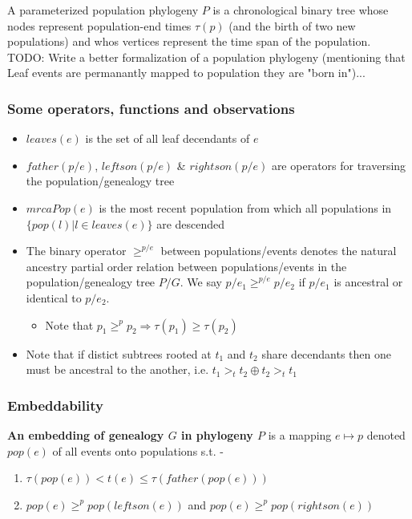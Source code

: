 \documentclass[11pt]{article}
\newcommand{\1}{\mathbbm{1}}
\begin{document}
A parameterized population phylogeny $P$ is a chronological binary tree whose nodes represent population-end times $\tau(p)$ (and the birth of two new populations) and whos vertices represent the time span of the population. TODO: Write a better formalization of a population phylogeny (mentioning that Leaf events are permanantly mapped to population they are "born in")...

\subsubsection{Some operators, functions and observations}

\begin{itemize}


\item $leaves(e)$ is the set of all leaf decendants of $e$

\item $father(p/e)$, $leftson(p/e)$ \& $rightson(p/e)$ are operators for traversing the population/genealogy tree

\item $mrcaPop(e)$ is the most recent population from which all populations in $\{pop(l) | l \in leaves(e)\}$ are descended


\item The binary operator $\geq^{p/e}$ between populations/events denotes the natural ancestry partial order relation between populations/events in the population/genealogy tree $P/G$. We say $p/e_1 \geq^{p/e} p/e_2$ if $p/e_1$ is ancestral or identical to $p/e_2$.
\begin{itemize}
\item Note that $p_1 \geq^p p_2 \Rightarrow \tau(p_1) \geq \tau(p_2)$
\end{itemize}

\item Note that if distict subtrees rooted at $t_1$ and $t_2$ share decendants then one must be ancestral to the another, i.e. $t_1 >_t t_2 \oplus t_2 >_t t_1 $
\end{itemize}


\subsubsection{Embeddability}


\textbf{An embedding of genealogy $G$ in phylogeny $P$} is a mapping $e \mapsto p$ denoted $pop(e)$ of all events onto populations s.t. - 

\begin{enumerate}
\item $\tau(pop(e)) < t(e) \leq \tau(father(pop(e)))$ 
\item $pop(e) \geq^p pop(leftson(e))$ and $pop(e) \geq^p pop(rightson(e))$
\end{enumerate}
\end{document}
